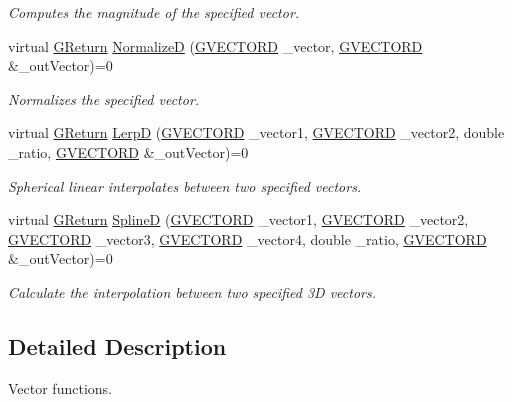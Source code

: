 \begin{DoxyCompactItemize}
\begin{DoxyCompactList}\small\item\em Computes the magnitude of the specified vector. \end{DoxyCompactList}\item 
virtual \hyperlink{namespaceGW_a67a839e3df7ea8a5c5686613a7a3de21}{G\+Return} \hyperlink{classGW_1_1MATH_1_1GVector_a0f950e0db160053011d6aa0b5cf3159d}{NormalizeD} (\hyperlink{structGW_1_1MATH_1_1GVECTORD}{G\+V\+E\+C\+T\+O\+RD} \+\_\+vector, \hyperlink{structGW_1_1MATH_1_1GVECTORD}{G\+V\+E\+C\+T\+O\+RD} \&\+\_\+out\+Vector)=0
\begin{DoxyCompactList}\small\item\em Normalizes the specified vector. \end{DoxyCompactList}\item 
virtual \hyperlink{namespaceGW_a67a839e3df7ea8a5c5686613a7a3de21}{G\+Return} \hyperlink{classGW_1_1MATH_1_1GVector_ad5014f18d3986d46a6a7fd4828e5040e}{LerpD} (\hyperlink{structGW_1_1MATH_1_1GVECTORD}{G\+V\+E\+C\+T\+O\+RD} \+\_\+vector1, \hyperlink{structGW_1_1MATH_1_1GVECTORD}{G\+V\+E\+C\+T\+O\+RD} \+\_\+vector2, double \+\_\+ratio, \hyperlink{structGW_1_1MATH_1_1GVECTORD}{G\+V\+E\+C\+T\+O\+RD} \&\+\_\+out\+Vector)=0
\begin{DoxyCompactList}\small\item\em Spherical linear interpolates between two specified vectors. \end{DoxyCompactList}\item 
virtual \hyperlink{namespaceGW_a67a839e3df7ea8a5c5686613a7a3de21}{G\+Return} \hyperlink{classGW_1_1MATH_1_1GVector_ac585c33ea16033decc9de649d917ee8d}{SplineD} (\hyperlink{structGW_1_1MATH_1_1GVECTORD}{G\+V\+E\+C\+T\+O\+RD} \+\_\+vector1, \hyperlink{structGW_1_1MATH_1_1GVECTORD}{G\+V\+E\+C\+T\+O\+RD} \+\_\+vector2, \hyperlink{structGW_1_1MATH_1_1GVECTORD}{G\+V\+E\+C\+T\+O\+RD} \+\_\+vector3, \hyperlink{structGW_1_1MATH_1_1GVECTORD}{G\+V\+E\+C\+T\+O\+RD} \+\_\+vector4, double \+\_\+ratio, \hyperlink{structGW_1_1MATH_1_1GVECTORD}{G\+V\+E\+C\+T\+O\+RD} \&\+\_\+out\+Vector)=0
\begin{DoxyCompactList}\small\item\em Calculate the interpolation between two specified 3D vectors. \end{DoxyCompactList}\end{DoxyCompactItemize}


\subsection{Detailed Description}
Vector functions. 


